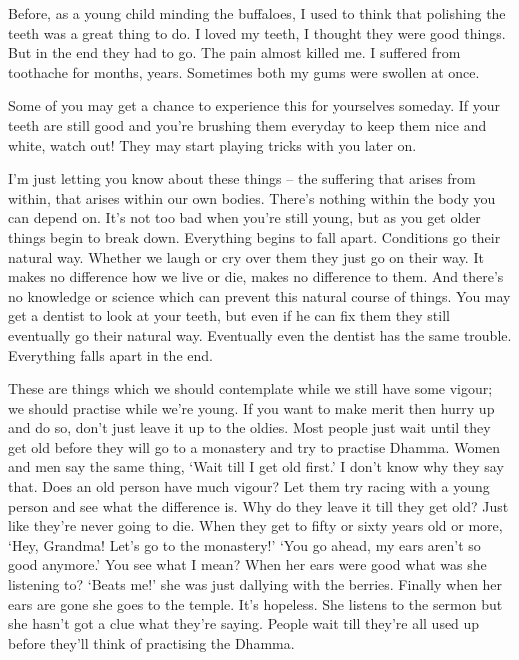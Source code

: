 Before, as a young child minding the buffaloes, I used to think that polishing the teeth was a great thing to do. I loved my teeth, I thought they were good things. But in the end they had to go. The pain almost killed me. I suffered from toothache for months, years. Sometimes both my gums were swollen at once.

Some of you may get a chance to experience this for yourselves someday. If your teeth are still good and you're brushing them everyday to keep them nice and white, watch out! They may start playing tricks with you later on.

I'm just letting you know about these things -- the suffering that arises from within, that arises within our own bodies. There's nothing within the body you can depend on. It's not too bad when you're still young, but as you get older things begin to break down. Everything begins to fall apart. Conditions go their natural way. Whether we laugh or cry over them they just go on their way. It makes no difference how we live or die, makes no difference to them. And there's no knowledge or science which can prevent this natural course of things. You may get a dentist to look at your teeth, but even if he can fix them they still eventually go their natural way. Eventually even the dentist has the same trouble. Everything falls apart in the end.

These are things which we should contemplate while we still have some vigour; we should practise while we're young. If you want to make merit then hurry up and do so, don't just leave it up to the oldies. Most people just wait until they get old before they will go to a monastery and try to practise Dhamma. Women and men say the same thing, `Wait till I get old first.' I don't know why they say that. Does an old person have much vigour? Let them try racing with a young person and see what the difference is. Why do they leave it till they get old? Just like they're never going to die. When they get to fifty or sixty years old or more, `Hey, Grandma! Let's go to the monastery!' `You go ahead, my ears aren't so good anymore.' You see what I mean? When her ears were good what was she listening to? `Beats me!' she was just dallying with the berries. Finally when her ears are gone she goes to the temple. It's hopeless. She listens to the sermon but she hasn't got a clue what they're saying. People wait till they're all used up before they'll think of practising the Dhamma.

